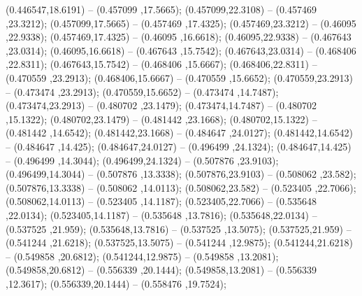  (0.446547,18.6191) -- (0.457099 ,17.5665);
 (0.457099,22.3108) -- (0.457469 ,23.3212);
 (0.457099,17.5665) -- (0.457469 ,17.4325);
 (0.457469,23.3212) -- (0.46095 ,22.9338);
 (0.457469,17.4325) -- (0.46095 ,16.6618);
 (0.46095,22.9338) -- (0.467643 ,23.0314);
 (0.46095,16.6618) -- (0.467643 ,15.7542);
 (0.467643,23.0314) -- (0.468406 ,22.8311);
 (0.467643,15.7542) -- (0.468406 ,15.6667);
 (0.468406,22.8311) -- (0.470559 ,23.2913);
 (0.468406,15.6667) -- (0.470559 ,15.6652);
 (0.470559,23.2913) -- (0.473474 ,23.2913);
 (0.470559,15.6652) -- (0.473474 ,14.7487);
 (0.473474,23.2913) -- (0.480702 ,23.1479);
 (0.473474,14.7487) -- (0.480702 ,15.1322);
 (0.480702,23.1479) -- (0.481442 ,23.1668);
 (0.480702,15.1322) -- (0.481442 ,14.6542);
 (0.481442,23.1668) -- (0.484647 ,24.0127);
 (0.481442,14.6542) -- (0.484647 ,14.425);
 (0.484647,24.0127) -- (0.496499 ,24.1324);
 (0.484647,14.425) -- (0.496499 ,14.3044);
 (0.496499,24.1324) -- (0.507876 ,23.9103);
 (0.496499,14.3044) -- (0.507876 ,13.3338);
 (0.507876,23.9103) -- (0.508062 ,23.582);
 (0.507876,13.3338) -- (0.508062 ,14.0113);
 (0.508062,23.582) -- (0.523405 ,22.7066);
 (0.508062,14.0113) -- (0.523405 ,14.1187);
 (0.523405,22.7066) -- (0.535648 ,22.0134);
 (0.523405,14.1187) -- (0.535648 ,13.7816);
 (0.535648,22.0134) -- (0.537525 ,21.959);
 (0.535648,13.7816) -- (0.537525 ,13.5075);
 (0.537525,21.959) -- (0.541244 ,21.6218);
 (0.537525,13.5075) -- (0.541244 ,12.9875);
 (0.541244,21.6218) -- (0.549858 ,20.6812);
 (0.541244,12.9875) -- (0.549858 ,13.2081);
 (0.549858,20.6812) -- (0.556339 ,20.1444);
 (0.549858,13.2081) -- (0.556339 ,12.3617);
 (0.556339,20.1444) -- (0.558476 ,19.7524);
